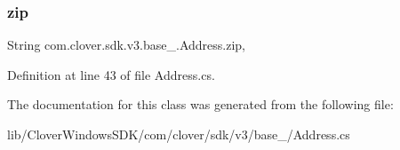 \subsubsection{\texorpdfstring{zip}{zip}}
{\footnotesize\ttfamily String com.\+clover.\+sdk.\+v3.\+base\+\_\+.\+Address.\+zip\hspace{0.3cm}{\ttfamily [get]}, {\ttfamily [set]}}



Definition at line 43 of file Address.\+cs.



The documentation for this class was generated from the following file\+:\begin{DoxyCompactItemize}
\item 
lib/\+Clover\+Windows\+S\+D\+K/com/clover/sdk/v3/base\+\_\+/Address.\+cs\end{DoxyCompactItemize}
